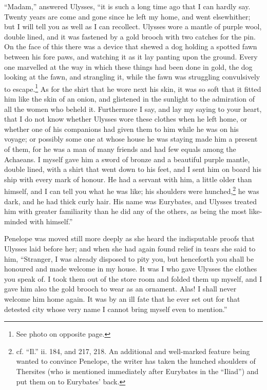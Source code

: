 “Madam,” answered Ulysses, “it is such a long time ago that I can hardly say.
Twenty years are come and gone since he left my home, and went elsewhither; but
I will tell you as well as I can recollect. Ulysses wore a mantle of purple
wool, double lined, and it was fastened by a gold brooch with two catches for
the pin. On the face of this there was a device that shewed a dog holding a
spotted fawn between his fore paws, and watching it as it lay panting upon the
ground. Every one marvelled at the way in which these things had been done in
gold, the dog looking at the fawn, and strangling it, while the fawn was
struggling convulsively to escape.\footnote{See photo on opposite page.} As for the shirt that he wore next
his skin, it was so soft that it fitted him like the skin of an onion, and
glistened in the sunlight to the admiration of all the women who beheld it.
Furthermore I say, and lay my saying to your heart, that I do not know whether
Ulysses wore these clothes when he left home, or whether one of his companions
had given them to him while he was on his voyage; or possibly some one at whose
house he was staying made him a present of them, for he was a man of many
friends and had few equals among the Achaeans. I myself gave him a sword of
bronze and a beautiful purple mantle, double lined, with a shirt that went down
to his feet, and I sent him on board his ship with every mark of honour. He had
a servant with him, a little older than himself, and I can tell you what he was
like; his shoulders were hunched,\footnote{cf. “Il.” ii. 184, and 217, 218. An additional and well-marked feature being
wanted to convince Penelope, the writer has taken the hunched shoulders of
Thersites (who is mentioned immediately after Eurybates in the “Iliad”) and
put them on to Eurybates’ back.} he was dark, and he had thick curly
hair. His name was Eurybates, and Ulysses treated him with greater familiarity
than he did any of the others, as being the most like-minded with himself.”

Penelope was moved still more deeply as she heard the indisputable proofs that
Ulysses laid before her; and when she had again found relief in tears she said
to him, “Stranger, I was already disposed to pity you, but henceforth you shall
be honoured and made welcome in my house. It was I who gave Ulysses the clothes
you speak of. I took them out of the store room and folded them up myself, and
I gave him also the gold brooch to wear as an ornament. Alas! I shall never
welcome him home again. It was by an ill fate that he ever set out for that
detested city whose very name I cannot bring myself even to mention.”

